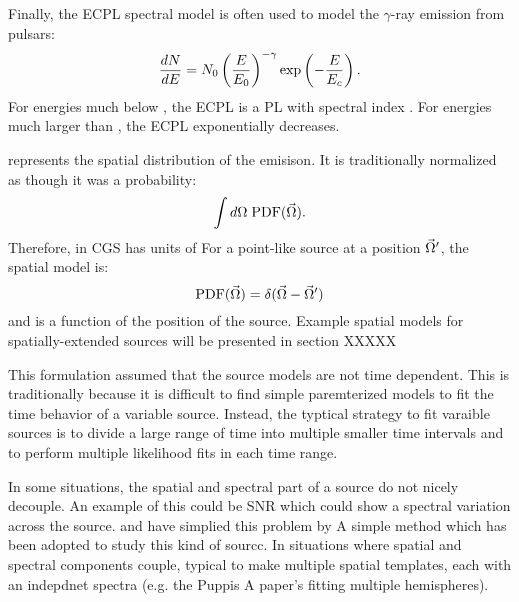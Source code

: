 Finally, the \ac{ECPL} spectral model is often
used to model the $\gamma$-ray emission from pulsars:
\begin{equation}
  \frac{dN}{dE} = N_0 \left(\frac{E}{E_0}\right)^{-\gamma}
  \exp\left(-\frac{E}{E_c}\right).
\end{equation}
For energies much below \Ecutoff, 
the \ac{ECPL} is a \ac{PL} with spectral index \spectralindex.
For energies much larger than \Ecutoff, the \ac{ECPL}
exponentially decreases.

\pdf represents the spatial distribution of the emisison.
It is traditionally normalized as though it was a probability:
  \begin{equation}
    \int d\Omega \; \text{PDF}(\vec\Omega).
  \end{equation}
Therefore, in \ac{CGS} \pdf has units of \pdfunits
For a point-like source at a position $\vec\Omega'$, the spatial model is:
  \begin{equation}
    \text{PDF}(\vec\Omega) = \delta(\vec\Omega - \vec\Omega')
  \end{equation}
and is a function of the position of the source.
Example spatial models for spatially-extended sources will be presented
in section XXXXX


This formulation assumed that the source models are not time dependent.
This is traditionally because it is difficult to find simple paremterized
models to fit the time behavior of a variable source. Instead, the typtical
strategy to fit varaible sources is to divide a large range of time
into multiple smaller time intervals 
and to perform multiple likelihood fits in each time range.

In some situations, the spatial and spectral part of a source do not nicely decouple.
An example of this could be \acs{SNR} which could show a spectral variation
across the source. 
\cite{katsuta_2012_fermi-lat-observation} and \cite{hewitt_2012_fermi-lat-observations} have
simplied this problem by
A simple method which has been adopted to study
this kind of sourcc. 
In situations where spatial and spectral components couple, typical to make
multiple spatial templates, each with an indepdnet spectra (e.g. the Puppis A paper's
fitting multiple hemispheres).

